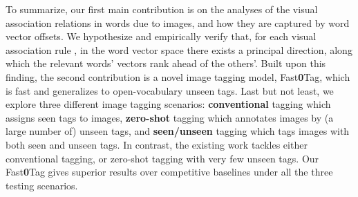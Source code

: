 \documentclass[10pt,twocolumn,letterpaper]{article}
\begin{document}
To summarize, our first main contribution is on the analyses of the visual association relations in  words due to images, and how they are captured by word vector offsets. We hypothesize and empirically verify that, for each visual association rule , in the word vector space there exists a principal direction, along which the relevant words\rq{} vectors rank ahead of the others\rq{}. Built upon this finding, the second contribution is a novel image tagging model, Fast\textbf{0}Tag, which is fast and generalizes to open-vocabulary unseen tags. Last but not least, we explore three different image tagging scenarios: \textbf{conventional} tagging which assigns seen tags to images, \textbf{zero-shot} tagging which annotates images by (a large number of) unseen tags, and \textbf{seen/unseen} tagging which tags images with both seen and unseen tags. In contrast, the existing work tackles either conventional tagging, or zero-shot tagging with very few unseen tags. Our Fast\textbf{0}Tag gives superior results over  competitive baselines under all the three testing scenarios.
\end{document}
